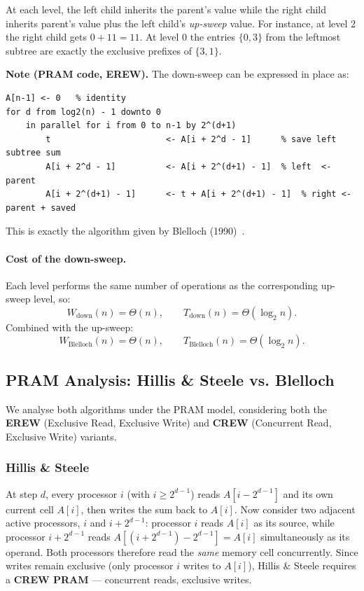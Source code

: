 At each level, the left child inherits the parent's value while the
right child inherits parent's value plus the left child's
\emph{up-sweep} value. For instance, at level 2 the right child gets
$0 + 11 = 11$. At level 0 the entries
$\{0,3\}$ from the leftmost subtree are exactly the exclusive prefixes
of $\{3,1\}$.

\begin{ppnote}
\textbf{Note (PRAM code, EREW).}
The down-sweep can be expressed in place as:
\begin{lstlisting}
A[n-1] <- 0   % identity
for d from log2(n) - 1 downto 0
    in parallel for i from 0 to n-1 by 2^(d+1)
        t                       <- A[i + 2^d - 1]      % save left subtree sum
        A[i + 2^d - 1]          <- A[i + 2^(d+1) - 1]  % left  <- parent
        A[i + 2^(d+1) - 1]      <- t + A[i + 2^(d+1) - 1]  % right <- parent + saved
\end{lstlisting}
This is exactly the algorithm given by Blelloch (1990)~\cite{blelloch1990}.
\end{ppnote}

\paragraph{Cost of the down-sweep.}
Each level performs the same number of operations as the corresponding
up-sweep level, so:
\[
W_{\mathrm{down}}(n) = \Theta(n), \qquad
T_{\mathrm{down}}(n) = \Theta(\log_2 n).
\]
Combined with the up-sweep:
\[
\boxed{\;W_{\mathrm{Blelloch}}(n) = \Theta(n), \qquad
T_{\mathrm{Blelloch}}(n) = \Theta(\log_2 n).\;}
\]

\subsection{PRAM Analysis: Hillis \& Steele vs. Blelloch}
\label{sec:pram-analysis}

We analyse both algorithms under the PRAM model, considering both the
\textbf{EREW} (Exclusive Read, Exclusive Write) and \textbf{CREW}
(Concurrent Read, Exclusive Write) variants.

\subsubsection{Hillis \& Steele}
At step $d$, every processor $i$ (with $i \ge 2^{d-1}$) reads
$A[i - 2^{d-1}]$ and its own current cell $A[i]$, then writes the
sum back to $A[i]$. Now consider two adjacent active processors, $i$
and $i + 2^{d-1}$: processor $i$ reads $A[i]$ as its source, while
processor $i + 2^{d-1}$ reads $A[(i+2^{d-1}) - 2^{d-1}] = A[i]$
simultaneously as its operand. Both processors therefore read the
\emph{same} memory cell concurrently. Since writes remain exclusive
(only processor $i$ writes to $A[i]$), Hillis \& Steele requires a
\textbf{CREW PRAM} --- concurrent reads, exclusive writes.

